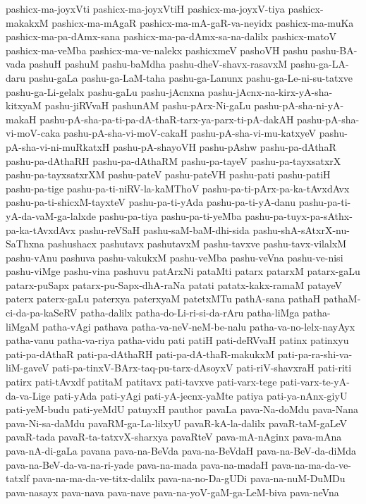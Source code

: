 {pashicx-ma-joyxVti
pashicx-ma-joyxVtiH
pashicx-ma-joyxV-tiya
pashicx-makakxM
pashicx-ma-mAgaR
pashicx-ma-mA-gaR-va-neyidx
pashicx-ma-muKa
pashicx-ma-pa-dAmx-sana
pashicx-ma-pa-dAmx-sa-na-dalilx
pashicx-matoV
pashicx-ma-veMba
pashicx-ma-ve-nalekx
pashicxmeV
pashoVH
pashu
pashu-BA-vada
pashuH
pashuM
pashu-baMdha
pashu-dheV-shavx-rasavxM
pashu-ga-LA-daru
pashu-gaLa
pashu-ga-LaM-taha
pashu-ga-Lanunx
pashu-ga-Le-ni-su-tatxve
pashu-ga-Li-gelalx
pashu-gaLu
pashu-jAcnxna
pashu-jAcnx-na-kirx-yA-sha-kitxyaM
pashu-jiRVvaH
pashunAM
pashu-pArx-Ni-gaLu
pashu-pA-sha-ni-yA-makaH
pashu-pA-sha-pa-ti-pa-dA-thaR-tarx-ya-parx-ti-pA-dakAH
pashu-pA-sha-vi-moV-caka
pashu-pA-sha-vi-moV-cakaH
pashu-pA-sha-vi-mu-katxyeV
pashu-pA-sha-vi-ni-muRkatxH
pashu-pA-shayoVH
pashu-pAshw
pashu-pa-dAthaR
pashu-pa-dAthaRH
pashu-pa-dAthaRM
pashu-pa-tayeV
pashu-pa-tayxsatxrX
pashu-pa-tayxsatxrXM
pashu-pateV
pashu-pateVH
pashu-pati
pashu-patiH
pashu-pa-tige
pashu-pa-ti-niRV-la-kaMThoV
pashu-pa-ti-pArx-pa-ka-tAvxdAvx
pashu-pa-ti-shicxM-tayxteV
pashu-pa-ti-yAda
pashu-pa-ti-yA-danu
pashu-pa-ti-yA-da-vaM-ga-lalxde
pashu-pa-tiya
pashu-pa-ti-yeMba
pashu-pa-tuyx-pa-sAthx-pa-ka-tAvxdAvx
pashu-reVSaH
pashu-saM-baM-dhi-sida
pashu-shA-sAtxrX-nu-SaThxna
pashushacx
pashutavx
pashutavxM
pashu-tavxve
pashu-tavx-vilalxM
pashu-vAnu
pashuva
pashu-vakukxM
pashu-veMba
pashu-veVna
pashu-ve-nisi
pashu-viMge
pashu-vina
pashuvu
patArxNi
pataMti
patarx
patarxM
patarx-gaLu
patarx-puSapx
patarx-pu-Sapx-dhA-raNa
patati
patatx-kakx-ramaM
patayeV
paterx
paterx-gaLu
paterxya
paterxyaM
patetxMTu
pathA-sana
pathaH
pathaM-ci-da-pa-kaSeRV
patha-dalilx
patha-do-Li-ri-si-da-rAru
patha-liMga
patha-liMgaM
patha-vAgi
pathava
patha-va-neV-neM-be-nalu
patha-va-no-lelx-nayAyx
patha-vanu
patha-va-riya
patha-vidu
pati
patiH
pati-deRVvaH
patinx
patinxyu
pati-pa-dAthaR
pati-pa-dAthaRH
pati-pa-dA-thaR-makukxM
pati-pa-ra-shi-va-liM-gaveV
pati-pa-tinxV-BArx-taq-pu-tarx-dAsoyxV
pati-riV-shavxraH
pati-riti
patirx
pati-tAvxdf
patitaM
patitavx
pati-tavxve
pati-varx-tege
pati-varx-te-yA-da-va-Lige
pati-yAda
pati-yAgi
pati-yA-jecnx-yaMte
patiya
pati-ya-nAnx-giyU
pati-yeM-budu
pati-yeMdU
patuyxH
pauthor
pavaLa
pava-Na-doMdu
pava-Nana
pava-Ni-sa-daMdu
pavaRM-ga-La-lilxyU
pavaR-kA-la-dalilx
pavaR-taM-gaLeV
pavaR-tada
pavaR-ta-tatxvX-sharxya
pavaRteV
pava-mA-nAginx
pava-mAna
pava-nA-di-gaLa
pavana
pava-na-BeVda
pava-na-BeVdaH
pava-na-BeV-da-diMda
pava-na-BeV-da-va-na-ri-yade
pava-na-mada
pava-na-madaH
pava-na-ma-da-ve-tatxlf
pava-na-ma-da-ve-titx-dalilx
pava-na-no-Da-gUDi
pava-na-nuM-DuMDu
pava-nasayx
pava-nava
pava-nave
pava-na-yoV-gaM-ga-LeM-biva
pava-neVna
}
